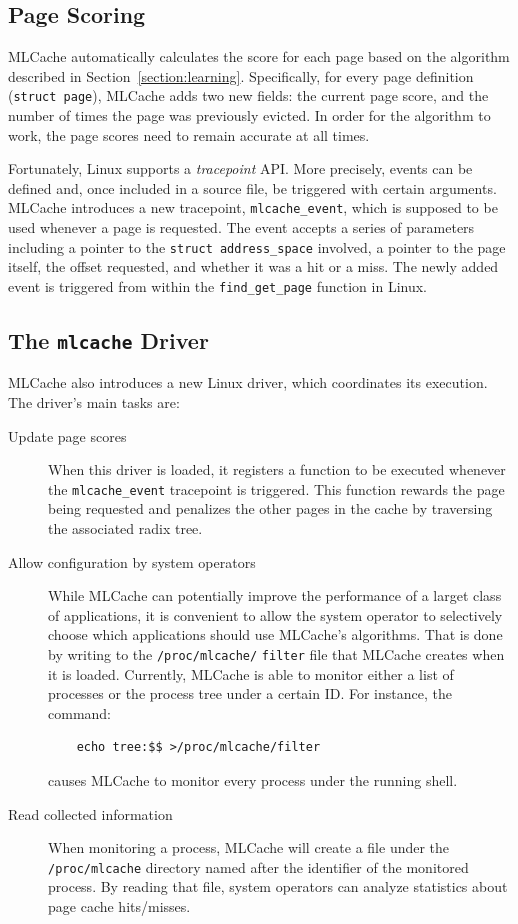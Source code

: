 \subsection{Page Scoring}

MLCache automatically calculates the score for each page based on the algorithm
described in Section~\ref{section:learning}. Specifically, for every page definition
(\texttt{struct page}), MLCache adds two new fields: the current page score, and
the number of times the page was previously evicted. In order for the algorithm
to work, the page scores need to remain accurate at all times.

Fortunately, Linux supports a \emph{tracepoint} API. More precisely, events can be
defined and, once included in a source file, be triggered with certain arguments.
MLCache introduces a new tracepoint, \texttt{mlcache\_event}, which is supposed
to be used whenever a page is requested. The event accepts a series of parameters
including a pointer to the \texttt{struct address\_space} involved, a pointer to the
page itself, the offset requested, and whether it was a hit or a miss. The newly
added event is triggered from within the \texttt{find\_get\_page} function in Linux.

\subsection{The \texttt{mlcache} Driver}

MLCache also introduces a new Linux driver, which coordinates its execution. The
driver's main tasks are:

\begin{description}
  \item[Update page scores] When this driver is loaded, it registers a function to be
    executed whenever the \texttt{mlcache\_event} tracepoint is triggered. This function
    rewards the page being requested and penalizes the other pages in the cache by
    traversing the associated radix tree.

  \item[Allow configuration by system operators] While
    MLCache can potentially improve the performance of a larget class of applications,
    it is convenient to allow the system operator to selectively choose which applications
    should use MLCache's algorithms. That is done by writing to the \texttt{/proc/mlcache/}
    \texttt{filter}
    file that MLCache creates when it is loaded. Currently, MLCache is able to monitor either
    a list of processes or the process tree under a certain ID. For instance, the command:
\begin{verbatim}
    echo tree:$$ >/proc/mlcache/filter
\end{verbatim}
    causes MLCache to monitor every process
    under the running shell.

  \item[Read collected information] When monitoring a process, MLCache will create a file
    under the \texttt{/proc/mlcache} directory named after the identifier of the monitored process.
    By reading that file, system operators can analyze statistics about page cache hits/misses.
\end{description}

